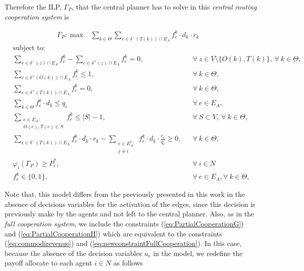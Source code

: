 \documentclass[authoryear]{elsarticle}
\begin{document}
Therefore the ILP, $\Gamma_P$, that the central planner has to solve in this \emph{central routing cooperation system} is

\begin{align}
        &  \Gamma_P: \max  & \sum_{k \in \Theta} \sum_{e \in \delta^-(T(k))\cap E_A}  f_e^k \cdot d_k \cdot r_k  &&   \label{eq:PartialCooperationA} 
    \end{align}
    \begin{align}
        & \text{subject to:}       && \nonumber\\
        & \sum_{e \in \delta^-(z)\cap E_A} f_e^k-\sum_{e \in \delta^+(z)\cap E_A} f_{e}^k = 0,            \quad && \forall\ z\in V\setminus\{O(k),T(k)\},\ \forall\ k\in\Theta,  \label{eq:PartialCooperationB}\\[1em]
& \sum_{e \in \delta^+(O(k))\cap E_A} f_e^k \leq 1,  && \forall\ k\in \Theta, \label{eq:PartialCooperationC} \\
& \sum_{e \in \delta^+(T(k))\cap E_A} f_e^k = 0,  && \forall\ k\in \Theta, \label{eq:PartialCooperationD} \\
 & \sum_{k \in \Theta} f_e^k\cdot d_k \leq q_e     && \forall\ e \in E_A, \label{eq:PartialCooperationE}  \\
 & \sum_{\substack{e \in E_A\colon \\ O(e),T(e) \in S}} f_e^k  \leq |S| -1,    && \forall\ S \subset V,\ \forall\ k \in \Theta, \label{eq:PartialCooperationF}\\
&\sum_{e \in \delta^-(T(k))\cap E_A}  f_e^k \cdot d_k \cdot r_k 
 -\sum_{\substack{e \in E_A^j\colon \\ j\not = i}} f_e^k \cdot d_k \cdot \frac{c_e}{q_e}\geq 0, && \forall\ k \in \Theta, \label{eq:PartialCooperationG} \\
& \varphi_i(\Gamma_P)   \geq P_i^*,     && \forall\ i\in N \label{eq:PartialCooperationH}\\
 & f_e^k  \in \{0,1\},    && \forall\ e \in E_A, \forall\ k \in \Theta, \label{eq:PartialCooperationI}
    \end{align}

Note that, this model differs from the previously presented in this work in the absence of decisions variables for the activation of the edges, since this decision is previously make by the agents and not left to the central planner. Also, as in the \emph{full cooperation system}, we include the constraints (\ref{eq:PartialCooperationG}) and (\ref{eq:PartialCooperationH})
which are equivalent to the constraints (\ref{eq:commodirevenue}) and (\ref{eq:newconstraintFullCooperation}). In this case, because the absence of the decision variables $u_e$ in the model, we redefine the payoff allocate to each agent $i\in N$ as follows
\end{document}
